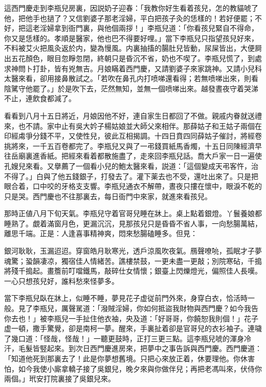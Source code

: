 這西門慶走到李瓶兒房裏，因説奶子迎春：「我教你好生看着孩兒，怎的教貓唬了他，把他手也撾了？又信劉婆子那老淫婦，平白把孩子灸的恁樣的！若好便罷；不好，把這老淫婦拿到衙門裏，與他個兩拶！」李瓶兒道：「你看孩兒緊自不得命，你又是恁樣的。孝順是醫家，他也巴不得要好哩。」當下李瓶兒只指望孩兒好來，不料被艾火把風灸返於内，變為慢風。内裏抽搐的腸肚兒皆動，尿屎皆出，大便屙出五花顏色，眼目忽睜忽閉，終朝只是昏沉不省，奶也不喫了。李瓶兒慌了，到處求神問卜打卦，皆有兇無吉。月娘瞞着西門慶，又請劉婆子來家跳神。又請小兒科太醫來看，卻用接鼻散試之。「若吹在鼻孔内打喷㖒還看得；若無喷㖒出來，則看陰騭守他罷了。」於是吹下去，茫然無知，並無一個喷㖒出來。越發晝夜守着哭涕不止，連飲食都減了。

看看到八月十五日將近，月娘因他不好，連自家生日都回了不做。親戚内眷就送禮來，也不請。家中止有吳大妗子楊姑娘並大師父來相伴。那薛姑子和王姑子兩個在印經䖏爭分錢不平，又使性兒，彼此互相揭調。十四日賁四同薛姑子催討，將經卷挑將來，一千五百卷都完了。李瓶兒又與了一弔錢買紙馬香燭，十五日同陳經濟早往岳廟裏進香紙。把經來看着都散施盡了，走來回李瓶兒話。喬大戶家一日一遍使孔嫂兒來看。又擧薦了一個看小兒的鮑太醫來看，説道：「這個變成天弔客忤，治不得了。」白與了他五錢銀子，打發去了。灌下薬去也不受，還吐出來了。只是把眼合着，口中咬的牙格支支響。李瓶兒通衣不解帶，晝夜只摟在懷中，眼淚不乾的只是哭。西門慶也不往那裏去，每日衙門中來家，就進來看孩兒。

那時正値八月下旬天氣。李瓶兒守着官哥兒睡在牀上。桌上點着銀燈。丫鬟養娘都睡熟了。覷着滿窗月色，更漏沉沉，見那孩兒只是昏昏不省人事，一向愁腸萬結，離思千端。正是：人逢喜事精神爽，悶來愁腸磕睡多。但見：

\begin{myquote}
銀河耿耿，玉漏迢迢。穿窗皓月耿寒光，透戶涼風吹夜氣。鴈聲嘹喨，孤眠才子夢魂驚；蛩韻凄凉，獨宿佳人情緒苦。譙樓禁鼓，一更未盡一更敲；別院寒砧，千搗將殘千搗起。畫簷前叮噹鐵馬，敲碎仕女情懷；銀臺上閃爍燈光，偏照佳人長嘆。一心只想孩兒好，誰料愁來怪夢多。
\end{myquote}

當下李瓶兒臥在牀上，似睡不睡，夢見花子虚従前門外來，身穿白衣，恰活時一般。見了李瓶兒，厲聲駡道：「潑賊淫婦，你如何抵盜我財物與西門慶？如今我告你去也！」被李瓶兒一手扯住他衣袖，央及道：「好哥哥，你饒恕我則個！」花子虚一頓，撒手驚覺，卻是南柯一夢。醒來，手裏扯着卻是官哥兒的衣衫袖子。連噦了幾口道：「怪哉，怪哉！」一聽更鼓時，正打三更三點。這李瓶兒唬的渾身冷汗，毛髮皆竪起來。到次日西門慶進房來，把夢中之事告訴與西門慶。西門慶道：「知道他死到那裏去了！此是你夢想舊境。只把心來放正着，休要理他。你休害怕，如今我使小廝拿轎子接了吳銀兒，晚夕來與你做伴兒；再把老馮叫來，伏侍你兩個。」玳安打院裏接了吳銀兒來。

